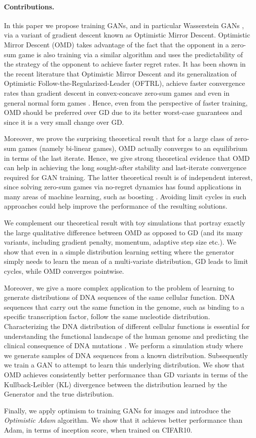 \paragraph{Contributions.} In this paper we propose training GANs, and in particular Wasserstein GANs \cite{arjovsky2017wasserstein}, via a variant of gradient descent known as Optimistic Mirror Descent. Optimistic Mirror Descent (OMD) takes advantage of the fact that the opponent in a zero-sum game is also training via a similar algorithm and uses the predictability of the strategy of the opponent to achieve faster regret rates. It has been shown in the recent literature that Optimistic Mirror Descent and its generalization of Optimistic Follow-the-Regularized-Leader (OFTRL), achieve faster convergence rates than gradient descent in convex-concave zero-sum games \citep{Rakhlin, Rakhlin2013b} and even in general normal form games \citep{Syrgkanis}. Hence, even from the perspective of faster training, OMD should be preferred over GD due to its better worst-case guarantees and since it is a very small change over GD. 

Moreover, we prove the surprising theoretical result that for a large class of zero-sum games (namely bi-linear games), OMD actually converges to an equilibrium in terms of the last iterate. Hence, we give strong theoretical evidence that OMD can help in achieving the long sought-after stability and last-iterate convergence required for GAN training. The latter theoretical result is of independent interest, since solving zero-sum games via no-regret dynamics has found applications in many areas of machine learning, such as boosting \citep{Freund1996}. Avoiding limit cycles in such approaches could help improve the performance of the resulting solutions.

We complement our theoretical result with toy simulations that portray exactly the large qualitative difference between OMD as opposed to GD (and its many variants, including gradient penalty, momentum, adaptive step size etc.). We show that even in a simple distribution learning setting where the generator simply needs to learn the mean of a multi-variate distribution, GD leads to limit cycles, while OMD converges pointwise. 

Moreover, we give a more complex application to the problem of learning to generate distributions of DNA sequences of the same cellular function. DNA sequences that carry out the same function in the genome, such as binding to a specific transcription factor, follow the same nucleotide distribution.  Characterizing the DNA distribution of different cellular functions is essential for understanding the functional landscape of the human genome and predicting the clinical consequence of DNA mutations \citep{Zeng2015, Zeng2016, Zeng2017}. We perform a simulation study where we generate samples of DNA sequences from a known distribution. Subsequently we train a GAN to attempt to learn this underlying distribution. We show that OMD achieves consistently better performance than GD variants in terms of the Kullback-Leibler (KL) divergence between the distribution learned by the Generator and the true distribution. 

Finally, we apply optimism to training GANs for images and introduce the \emph{Optimistic Adam} algorithm. We show that it achieves better performance than Adam, in terms of inception score, when trained on CIFAR10.


